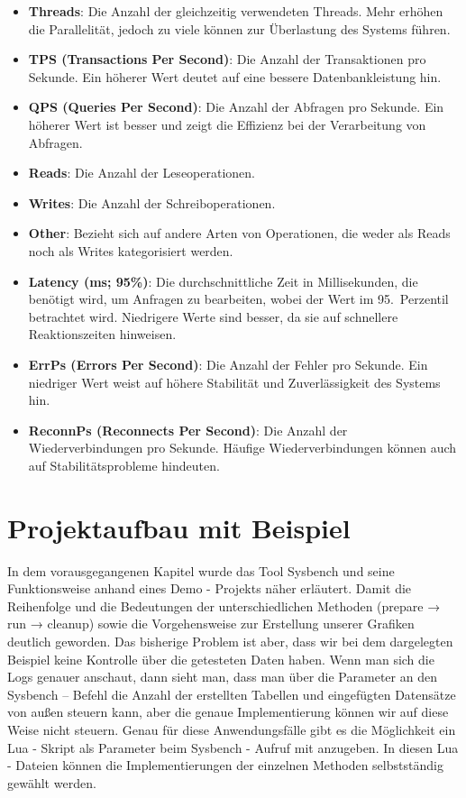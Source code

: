 \begin{itemize}
    \item \textbf{Threads}: Die Anzahl der gleichzeitig verwendeten Threads.
    Mehr erhöhen die Parallelität, jedoch zu viele können zur Überlastung des Systems führen.
    \item \textbf{TPS (Transactions Per Second)}: Die Anzahl der Transaktionen pro Sekunde.
    Ein höherer Wert deutet auf eine bessere Datenbankleistung hin.
    \item \textbf{QPS (Queries Per Second)}: Die Anzahl der Abfragen pro Sekunde.
    Ein höherer Wert ist besser und zeigt die Effizienz bei der Verarbeitung von Abfragen.
    \item \textbf{Reads}: Die Anzahl der Leseoperationen.
    \item \textbf{Writes}: Die Anzahl der Schreiboperationen.
    \item \textbf{Other}: Bezieht sich auf andere Arten von Operationen, die weder als Reads noch als Writes kategorisiert werden.
    \item \textbf{Latency (ms; 95\%)}: Die durchschnittliche Zeit in Millisekunden, die benötigt wird, um Anfragen zu bearbeiten, wobei der Wert im 95.\ Perzentil betrachtet wird.
    Niedrigere Werte sind besser, da sie auf schnellere Reaktionszeiten hinweisen.
    \item \textbf{ErrPs (Errors Per Second)}: Die Anzahl der Fehler pro Sekunde.
    Ein niedriger Wert weist auf höhere Stabilität und Zuverlässigkeit des Systems hin.
    \item \textbf{ReconnPs (Reconnects Per Second)}: Die Anzahl der Wiederverbindungen pro Sekunde.
    Häufige Wiederverbindungen können auch auf Stabilitätsprobleme hindeuten.
\end{itemize}

\section{Projektaufbau mit Beispiel}\label{sec:projektaufbau-mit-beispiel}
In dem vorausgegangenen Kapitel  wurde das Tool Sysbench und seine Funktionsweise anhand eines Demo - Projekts näher erläutert.
Damit die Reihenfolge und die Bedeutungen der unterschiedlichen Methoden (prepare → run → cleanup) sowie die Vorgehensweise zur Erstellung unserer Grafiken deutlich geworden.
Das bisherige Problem ist aber, dass wir bei dem dargelegten Beispiel keine Kontrolle über die getesteten Daten haben.
Wenn man sich die Logs genauer anschaut, dann sieht man, dass man über die Parameter an den Sysbench – Befehl die Anzahl der erstellten Tabellen und eingefügten Datensätze von außen steuern kann, aber die genaue Implementierung können wir auf diese Weise nicht steuern.
Genau für diese Anwendungsfälle gibt es die Möglichkeit ein Lua - Skript als Parameter beim Sysbench - Aufruf mit anzugeben.
In diesen Lua - Dateien können die Implementierungen der einzelnen Methoden selbstständig gewählt werden.

